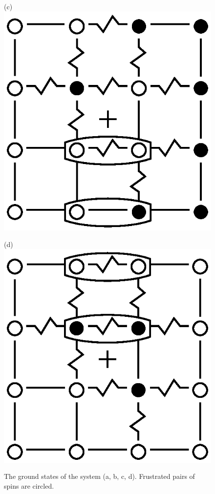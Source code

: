 \documentclass[preprint,12pt]{elsarticle}
\begin{document}
\begin{figure}[H]
\begin{minipage}[h]{0.2\linewidth}
	\end{minipage}
	\hfill
	\begin{minipage}[h]{0.2\linewidth}
		\centering(c)
		\includegraphics[width=1\linewidth]{pictures/Cl1_Type2_gs3.eps}
	\end{minipage}
	\hfill
	\begin{minipage}[h]{0.2\linewidth}
		\centering(d)
		\includegraphics[width=1\linewidth]{pictures/Cl1_Type2_gs4.eps}
	\end{minipage}
	\caption{The ground states of the system (a, b, c, d). Frustrated pairs of spins are circled.}
	\label{fig:4x4.1}
	
\end{figure}
\end{document}
